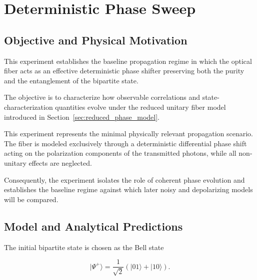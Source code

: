 
\newpage

\section{Deterministic Phase Sweep}


\subsection*{Objective and Physical Motivation}

This experiment establishes the baseline propagation regime in which the optical fiber acts as an effective deterministic phase shifter preserving both the purity and the entanglement of the bipartite state.

The objective is to characterize how observable correlations and state-characterization quantities evolve under the reduced unitary fiber model introduced in Section~\ref{sec:reduced_phase_model}.

This experiment represents the minimal physically relevant propagation scenario. The fiber is modeled exclusively through a deterministic differential phase shift acting on the polarization components of the transmitted photons, while all non-unitary effects are neglected.

Consequently, the experiment isolates the role of coherent phase evolution and establishes the baseline regime against which later noisy and depolarizing models will be compared.


\subsection*{Model and Analytical Predictions}

The initial bipartite state is chosen as the Bell state

\[
|\Psi^{+}\rangle
=
\frac{1}{\sqrt{2}}
\left(
|01\rangle + |10\rangle
\right).
\]

